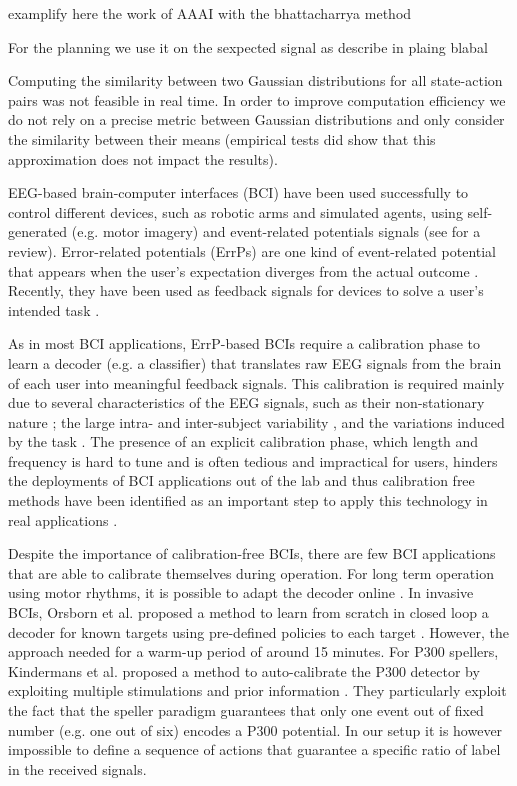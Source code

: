 examplify here the work of AAAI with the bhattacharrya method


For the planning we use it on the sexpected signal as describe in plaing blabal

Computing the similarity between two Gaussian distributions for all state-action pairs was not feasible in real time. In order to improve computation efficiency we do not rely on a precise metric between Gaussian distributions and only consider the similarity between their means (empirical tests did show that this approximation does not impact the results).


EEG-based brain-computer interfaces (BCI) have been used successfully to control different devices, such as robotic arms and simulated agents, using self-generated (e.g. motor imagery) and event-related potentials signals (see \cite{millan10} for a review). 
%
Error-related potentials (ErrPs) are one kind of event-related potential that appears when the user's expectation diverges from the actual outcome \cite{Falkenstein00}. Recently, they have been used as feedback signals for devices to solve a user's intended task \cite{chavarriaga2010learning,iturrate13}.

As in most BCI applications, ErrP-based BCIs require a calibration phase to learn a decoder (e.g. a classifier) that translates raw EEG signals from the brain of each user into meaningful feedback signals. This calibration is required mainly due to several characteristics of the EEG signals, such as their non-stationary nature \cite{vidaurre11}; the large intra- and inter-subject variability \cite{Polich1997}, and the variations induced by the task \cite{iturrate2013task}. The presence of an explicit calibration phase, which length and frequency is hard to tune and is often tedious and impractical for users, hinders the deployments of BCI applications out of the lab and thus calibration free methods have been identified as an important step to apply this technology in real applications \cite{millan10}.

Despite the importance of calibration-free BCIs, there are few BCI applications that are able to calibrate themselves during operation. For long term operation using motor rhythms, it is possible to adapt the decoder online \cite{vidaurre2010towards}. In invasive BCIs, Orsborn et al. proposed a method to learn from scratch in closed loop a decoder for known targets using pre-defined policies to each target \cite{Orsborn2012}. However, the approach needed for a warm-up period of around 15 minutes. For P300 spellers, Kindermans et al. proposed a method to auto-calibrate the P300 detector by exploiting multiple stimulations and prior information \cite{Kindermans2012a,Kindermans2012b,tangermann2013zero}. They particularly exploit the fact that the speller paradigm guarantees that only one event out of fixed number (e.g. one out of six) encodes a P300 potential. In our setup it is however impossible to define a sequence of actions that guarantee a specific ratio of label in the received signals.


